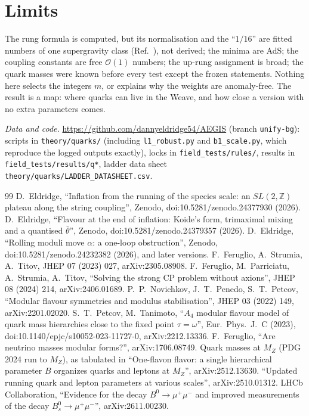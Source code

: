 \documentclass[aps,prd,twocolumn,superscriptaddress,nofootinbib,showkeys]{revtex4-2}
\begin{document}
\section{Limits}
The rung formula is computed, but its normalisation and the ``$1/16$'' are fitted numbers of one supergravity class (Ref.~\cite{NPP}), not derived; the minima are AdS; the coupling constants are free $\mathcal O(1)$ numbers; the up-rung assignment is broad; the quark masses were known before every test except the frozen statements. Nothing here selects the integers $m$, or explains why the weights are anomaly-free. The result is a map: where quarks can live in the Weave, and how close a version with no extra parameters comes.

\textit{Data and code.} \url{https://github.com/dannyeldridge54/AEGIS} (branch \texttt{unify-bg}): scripts in \texttt{theory/quarks/} (including \texttt{l1\_robust.py} and \texttt{b1\_scale.py}, which reproduce the logged outputs exactly), locks in \texttt{field\_tests/rules/}, results in \texttt{field\_tests/results/q*}, ladder data sheet \texttt{theory/quarks/LADDER\_DATASHEET.csv}.

\begin{thebibliography}{99}
 D.~Eldridge, ``Inflation from the running of the species scale: an $SL(2,\mathbb Z)$ plateau along the string coupling'', Zenodo, doi:10.5281/zenodo.24377930 (2026).
 D.~Eldridge, ``Flavour at the end of inflation: Koide's form, trimaximal mixing and a quantised $\bar\theta$'', Zenodo, doi:10.5281/zenodo.24379357 (2026).
 D.~Eldridge, ``Rolling moduli move $\alpha$: a one-loop obstruction'', Zenodo, doi:10.5281/zenodo.24232382 (2026), and later versions.
 F.~Feruglio, A.~Strumia, A.~Titov, JHEP 07 (2023) 027, arXiv:2305.08908.
 F.~Feruglio, M.~Parriciatu, A.~Strumia, A.~Titov, ``Solving the strong CP problem without axions'', JHEP 08 (2024) 214, arXiv:2406.01689.
 P.~P.~Novichkov, J.~T.~Penedo, S.~T.~Petcov, ``Modular flavour symmetries and modulus stabilisation'', JHEP 03 (2022) 149, arXiv:2201.02020.
 S.~T.~Petcov, M.~Tanimoto, ``$A_4$ modular flavour model of quark mass hierarchies close to the fixed point $\tau=\omega$'', Eur.\ Phys.\ J.\ C (2023), doi:10.1140/epjc/s10052-023-11727-0, arXiv:2212.13336.
 F.~Feruglio, ``Are neutrino masses modular forms?'', arXiv:1706.08749.
 Quark masses at $M_Z$ (PDG 2024 run to $M_Z$), as tabulated in ``One-flavon flavor: a single hierarchical parameter $B$ organizes quarks and leptons at $M_Z$'', arXiv:2512.13630.
 ``Updated running quark and lepton parameters at various scales'', arXiv:2510.01312.
 LHCb Collaboration, ``Evidence for the decay $B^0\to\mu^+\mu^-$ and improved measurements of the decay $B^0_s\to\mu^+\mu^-$'', arXiv:2611.00230.
\end{thebibliography}
\end{document}
